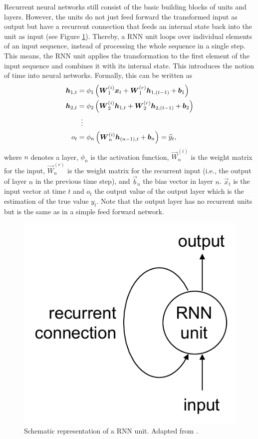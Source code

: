Recurrent neural networks still consist of the basic building blocks of units and layers. However, the units do not just feed forward the transformed input as output but have a recurrent connection that feeds an internal state back into the unit as input (see Figure \ref{Fig:RNNunit}). Thereby, a RNN unit loops over individual elements of an input sequence, instead of processing the whole sequence in a single step. This means, the RNN unit applies the transformation to the first element of the input sequence and combines it with its internal state. This introduces the notion of time into neural networks. Formally, this can be written as
%
\begin{equation} \label{Eq:RNN}
\begin{split}
    \vec{h}_{1,t}&=\phi_1\left(\vec{W}_1^{(i)}\vec{x}_t+\vec{W}^{(r)}_1\vec{h}_{1,(t-1)}+\vec{b}_1\right)\\
    \vec{h}_{2,t}&=\phi_2\left(\vec{W}_2^{(i)}\vec{h}_{1,t}+\vec{W}^{(r)}_2\vec{h}_{2,(t-1)}+\vec{b}_2\right)\\
    &\setbox0\hbox{=}\mathrel{\makebox[\wd0]{\hfil\vdots\hfil}}\\
    o_t&=\phi_n\left(\vec{W}_n^{(i)}\vec{h}_{(n-1),t}+\vec{b}_n\right)=\widehat{y}_t,
\end{split}
\end{equation}
%
where $n$ denotes a layer, $\phi_n$ is the activation function, $\vec{W}_n^{(i)}$ is the weight matrix for the input, $\vec{W}_n^{(r)}$ is the weight matrix for the recurrent input (i.e., the output of layer $n$ in the previous time step), and $\vec{b}_n$ the bias vector in layer $n$. $\vec{x}_t$ is the input vector at time $t$ and $o_t$ the output value of the output layer which is the estimation of the true value $y_t$. Note that the output layer has no recurrent units but is the same as in a simple feed forward network.
%
\begin{figure}[htbp]
    \centering
    \includegraphics[scale=0.5]{thesis/figures/RNNunit.pdf}
    \caption[Schematic representation of a RNN unit]{Schematic representation of a RNN unit. Adapted from \citet{chollet:2018}.}
    \label{Fig:RNNunit}
\end{figure}

